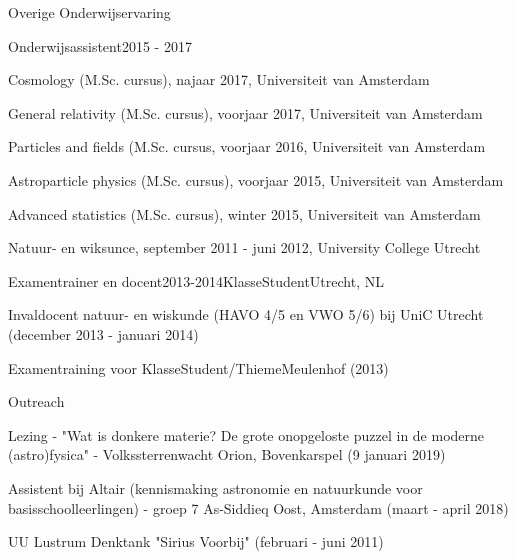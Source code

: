 \begin{rSection}{Overige Onderwijservaring}

\begin{rSubsection}{Onderwijsassistent}{2015 - 2017}{}{}
 \vspace{-1.5em}
	\item Cosmology (M.Sc. cursus), najaar 2017, Universiteit van Amsterdam
	\item General relativity (M.Sc. cursus), voorjaar 2017, Universiteit van Amsterdam
	\item Particles and fields (M.Sc. cursus, voorjaar 2016, Universiteit van Amsterdam
	\item Astroparticle physics (M.Sc. cursus), voorjaar 2015, Universiteit van Amsterdam
	\item Advanced statistics (M.Sc. cursus), winter 2015, Universiteit van Amsterdam
  \item Natuur- en wiksunce, september 2011 - juni 2012, University College Utrecht 
\end{rSubsection}

\begin{rSubsection}{Examentrainer en docent}{2013-2014}{KlasseStudent}{Utrecht, NL}
  \vspace{-1.5em}
  \item Invaldocent natuur- en wiskunde (HAVO 4/5 en VWO 5/6) bij UniC Utrecht (december 2013 - januari 2014)
  \item Examentraining voor KlasseStudent/ThiemeMeulenhof (2013)
\end{rSubsection}

\begin{rSubsection}{Outreach}{}{}{}
  \vspace{-1.5em}
      \item Lezing - "Wat is donkere materie? De grote onopgeloste puzzel in de moderne (astro)fysica" - Volkssterrenwacht Orion,  Bovenkarspel (9 januari 2019)
      \item Assistent bij Altair (kennismaking astronomie en natuurkunde voor basisschoolleerlingen) - groep 7 As-Siddieq Oost, Amsterdam (maart - april 2018)
      \item UU Lustrum Denktank "Sirius Voorbij" (februari - juni 2011)
\end{rSubsection}
\end{rSection}


